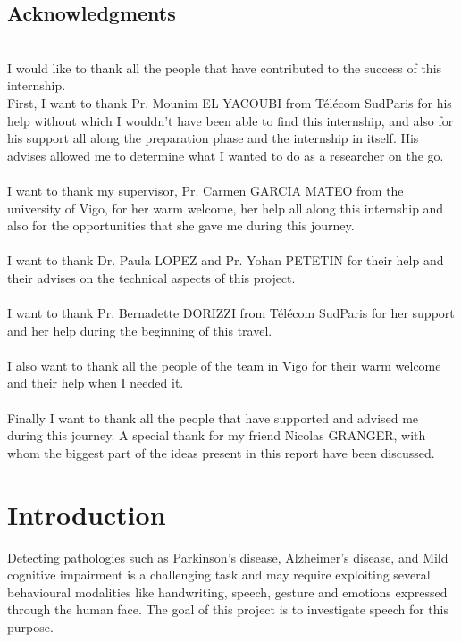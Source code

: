 \documentclass{report}
\begin{document}
	\tableofcontents
	
	\newpage
	
	\section*{Acknowledgments}
	
	~\\[0.5cm]
	I would like to thank all the people that have contributed to the success of this internship.
	\\[1cm]
	
	
	First, I want to thank Pr. Mounim EL YACOUBI from Télécom SudParis for his help without which I wouldn't have been able to find this internship, and also for his support all along the preparation phase and the internship in itself. His advises allowed me to determine what I wanted to do as a researcher on the go.\\\\
	I want to thank my supervisor, Pr. Carmen GARCIA MATEO from the university of Vigo, for her warm welcome, her help all along this internship and also for the opportunities that she gave me during this journey.\\\\
	I want to thank Dr. Paula LOPEZ and Pr. Yohan PETETIN for their help and their advises on the technical aspects of this project.\\\\
	I want to thank Pr. Bernadette DORIZZI from Télécom SudParis for her support and her help during the beginning of this travel.\\\\
	I also want to thank all the people of the team in Vigo for their warm welcome and their help when I needed it.\\\\
	
	Finally I want to thank all the people that have supported and advised me during this journey. A special thank for my friend Nicolas GRANGER, with whom the biggest part of the ideas present in this report have been discussed.
	
	\newpage
	
	\chapter{Introduction}
	
	Detecting pathologies such as Parkinson's disease, Alzheimer's disease, and Mild cognitive impairment is a challenging task and may require exploiting several behavioural modalities like handwriting, speech, gesture and emotions expressed through the human face. The goal of this project is to investigate speech for this purpose.\\
	
\end{document}
